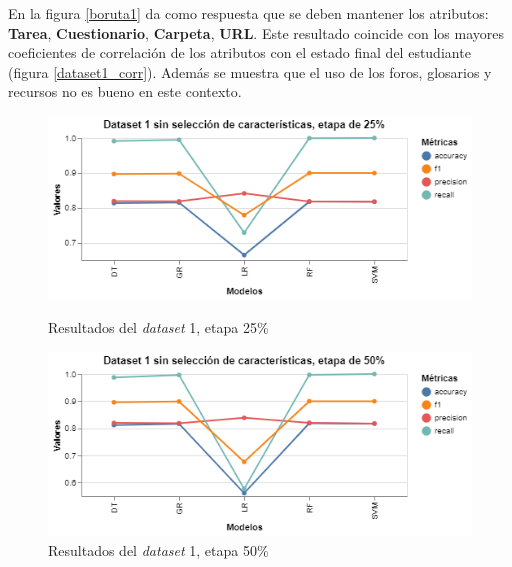 En la figura \ref{boruta1} da como respuesta que se deben mantener los atributos: \textbf{Tarea}, \textbf{Cuestionario}, 
\textbf{Carpeta}, \textbf{URL}. Este resultado coincide con los mayores coeficientes de correlación de los atributos con el estado final del estudiante (figura \ref{dataset1_corr}). 
Además se muestra que el uso de los foros, glosarios y recursos no es bueno en este contexto.




\begin{figure}[htbp]
    \centering
    \begin{minipage}[t]{0.50\textwidth}
        \centering
        \includegraphics[width = \textwidth]{Graphics/dataset_1_25.png}
        \caption{Resultados del \textit{dataset} 1, etapa 25\%}
        \label{dataset1_25}
    \end{minipage}\hfill
    \begin{minipage}[t]{0.50\textwidth}
        \centering
        \includegraphics[width = \textwidth]{Graphics/dataset_1_50.png}
        \caption{Resultados del \textit{dataset} 1, etapa 50\%}
        \label{dataset1_50}
    \end{minipage}
\end{figure}

